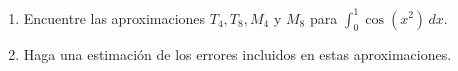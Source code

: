 \item 
    \begin{enumerate}
        \item[(a)] Encuentre las aproximaciones $T_4, T_8, M_4$ y $M_8$ para $\int_{0}^{1} \cos(x^2) \, dx$.
        \item[(b)] Haga una estimación de los errores incluidos en estas aproximaciones.
    \end{enumerate}
